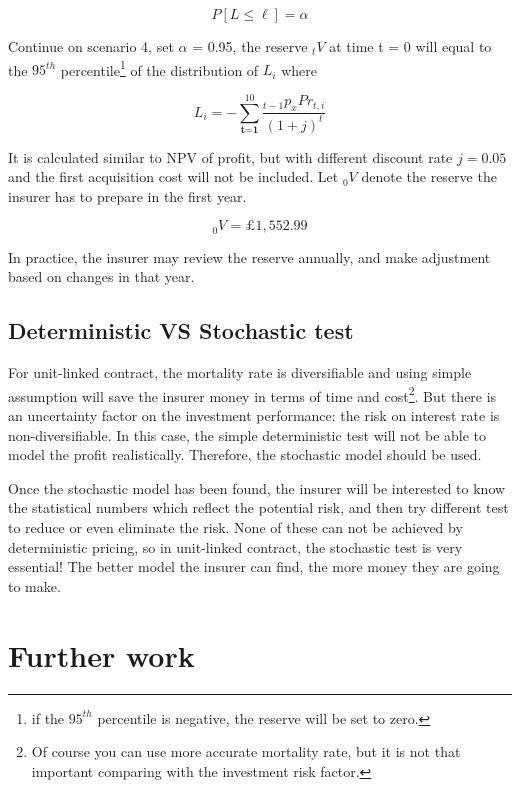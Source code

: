 \documentclass{report}
\begin{document}
\[
P[L\leq \ell] = \alpha
\]

Continue on scenario 4, set $\alpha$ = 0.95, the reserve $_tV$ at time t = 0 will equal to the $95^{th}$ percentile\footnote{if the $95^{th}$ percentile is negative, the reserve will be set to zero.} of the distribution of $L_i$ where

\[
L_i = - \sum_{\textbf{t=1}}^{10}\frac{_{t-1}p_x Pr_{t,i}}{(1+j)^t}
\]

It is calculated similar to NPV of profit, but with different discount rate $j = 0.05$ and the first acquisition cost will not be included. Let $_0V$ denote the reserve the insurer has to prepare in the first year.

\[
_0V = \pounds 1,552.99
\]


In practice, the insurer may review the reserve annually, and make adjustment based on changes in that year. 



\section{Deterministic VS Stochastic test}

For unit-linked contract, the mortality rate is diversifiable and using simple assumption will save the insurer money in terms of time and cost\footnote{Of course you can use more accurate mortality rate, but it is not that important comparing with the investment risk factor.}. But there is an uncertainty factor on the investment performance: the risk on interest rate is non-diversifiable. In this case, the simple deterministic test will not be able to model the profit realistically. Therefore, the stochastic model should be used. 

Once the stochastic model has been found, the insurer will be interested to know the statistical numbers which reflect the potential risk, and then try different test to reduce or even eliminate the risk. None of these can not be achieved by deterministic pricing, so in unit-linked contract, the stochastic test is very essential! The better model the insurer can find, the more money they are going to make.

















\chapter{Further work}    
\end{document}
